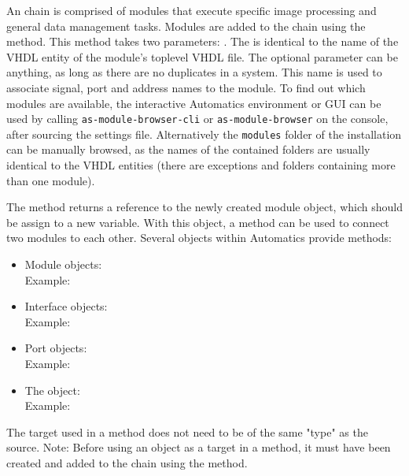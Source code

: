 An \asterics chain is comprised of modules that execute specific image processing and general data management tasks. Modules are added to the chain using the  method.
This method takes two parameters: .
The  is identical to the name of the VHDL entity of the module's toplevel VHDL file.
The optional  parameter can be anything, as long as there are no duplicates in a system.
This name is used to associate signal, port and address names to the module.
To find out which modules are available, the interactive Automatics environment or GUI can be used by calling \texttt{as-module-browser-cli} or \texttt{as-module-browser} on the console, after sourcing the \asterics settings file.
Alternatively the \texttt{modules} folder of the \asterics installation can be manually browsed, as the names of the contained folders are usually identical to the VHDL entities (there are exceptions and folders containing more than one module).

The  method returns a reference to the newly created module object, which should be assign to a new variable.
With this object, a  method can be used to connect two modules to each other. Several objects within Automatics provide  methods:
\begin{itemize}
\setlength\itemsep{0.3em}
\item Module objects: \\Example: 
\item Interface objects: \\Example: 
\item Port objects: \\Example: 
\item The  object: \\Example: 
\end{itemize}

The target used in a  method does not need to be of the same "type" as the source.
Note: Before using an object as a target in a  method, it must have been created and added to the chain using the  method.

